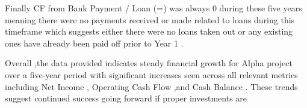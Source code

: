  Finally CF from Bank Payment / Loan (=) was always 0 during these five years meaning there were no payments received or made related to loans during this timeframe which suggests either there were no loans taken out or any existing ones have already been paid off prior to Year 1 .  

 Overall ,the data provided indicates steady financial growth for Alpha project over a five-year period with significant increases seen across all relevant metrics including Net Income , Operating Cash Flow ,and Cash Balance . These trends suggest continued success going forward if proper investments are